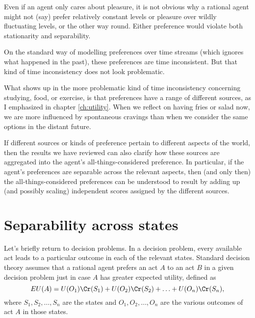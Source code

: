 Even if an agent only cares about pleasure, it is not obvious why a
rational agent might not (say) prefer relatively constant levels or
pleasure over wildly fluctuating levels, or the other way round.
Either preference would violate both stationarity and separability.


On the standard way of modelling preferences over time streams (which ignores
what happened in the past), these preferences are time inconsistent. But that
kind of time inconsistency does not look problematic.

What shows up in the more problematic kind of time inconsistency
concerning studying, food, or exercise, is that preferences have a
range of different sources, as I emphasized in chapter
\ref{ch:utility}. When we reflect on having fries or salad now, we are
more influenced by spontaneous cravings than when we consider the same
options in the distant future.

If different sources or kinds of preference pertain to different
aspects of the world, then the results we have reviewed can also clarify
how these sources are aggregated into the agent's
all-things-considered preference. In particular, if the agent's
preferences are separable across the relevant aspects, then (and only
then) the all-things-considered preferences can be understood to
result by adding up (and possibly scaling) independent scores assigned
by the different sources.

%

\section{Separability across states}

Let's briefly return to decision problems. In a decision problem,
every available act leads to a particular outcome in each of the
relevant states. Standard decision theory assumes that a rational
agent prefers an act $A$ to an act $B$ in a given decision problem
just in case $A$ has greater expected utility, defined as
\[
EU(A) = U(O_1)\Cr(S_1) + U(O_2)\Cr(S_2) + \ldots + U(O_n)\Cr(S_n),
\]
where $S_1,S_2,\ldots,S_n$ are the states and $O_1,O_2,\ldots,O_n$ are
the various outcomes of act $A$ in those states.

